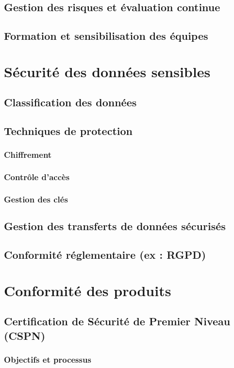 \subsection{Gestion des risques et évaluation continue}
\subsection{Formation et sensibilisation des équipes}
\section{Sécurité des données sensibles}
\subsection{Classification des données}
\subsection{Techniques de protection}
\subsubsection{Chiffrement}
\subsubsection{Contrôle d'accès}
\subsubsection{Gestion des clés}
\subsection{Gestion des transferts de données sécurisés}
\subsection{Conformité réglementaire (ex : RGPD)}
\section{Conformité des produits}
\subsection{Certification de Sécurité de Premier Niveau (CSPN)}
\subsubsection{Objectifs et processus}
